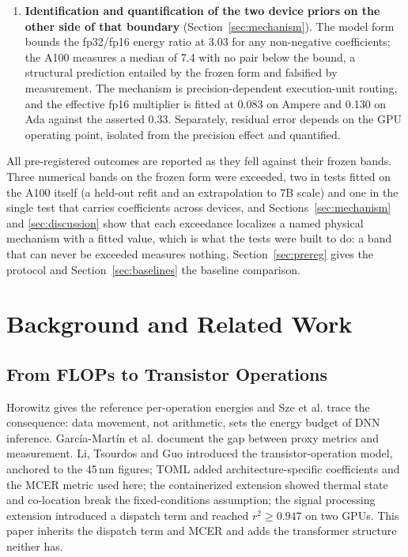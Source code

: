 \documentclass[conference]{IEEEtran}
\begin{document}
\begin{enumerate}
\item \textbf{Identification and quantification of the two device priors on
the other side of that boundary} (Section~\ref{sec:mechanism}). The model
form bounds the fp32/fp16 energy ratio at 3.03 for any non-negative
coefficients; the A100 measures a median of 7.4 with no pair below the
bound, a structural prediction entailed by the frozen form and falsified
by measurement. The mechanism is precision-dependent execution-unit routing, and the effective
fp16 multiplier is fitted at 0.083 on Ampere and 0.130 on Ada against the
asserted 0.33. Separately, residual error depends on the GPU operating
point, isolated from the precision effect and quantified.
\end{enumerate}

All pre-registered outcomes are reported as they fell against their frozen
bands. Three numerical bands on the frozen form were exceeded, two in tests
fitted on the A100 itself (a held-out refit and an extrapolation to 7B
scale) and one in the single test that carries coefficients across devices,
and Sections~\ref{sec:mechanism} and \ref{sec:discussion} show that each
exceedance localizes a named physical mechanism with a fitted value, which
is what the tests were built to do: a band that can never be exceeded
measures nothing. Section~\ref{sec:prereg} gives the protocol and
Section~\ref{sec:baselines} the baseline comparison.

\section{Background and Related Work}
\label{sec:related}

\subsection{From FLOPs to Transistor Operations}

Horowitz \cite{horowitz2014} gives the reference per-operation energies and
Sze et al. \cite{sze2017} trace the consequence: data movement, not
arithmetic, sets the energy budget of DNN inference. Garc\'ia-Mart\'in et
al. \cite{garciamartin2019} document the gap between proxy metrics and
measurement. Li, Tsourdos and Guo \cite{li2024} introduced the
transistor-operation model, anchored to the 45\,nm figures; TOML
\cite{toml2026flairs} added architecture-specific coefficients and the MCER
metric used here; the containerized extension \cite{tomlcloud2026} showed
thermal state and co-location break the fixed-conditions assumption; the
signal processing extension \cite{tomlsignals2026} introduced a dispatch
term and reached $r^2 \geq 0.947$ on two GPUs. This paper inherits the
dispatch term and MCER and adds the transformer structure neither has.
\end{document}
